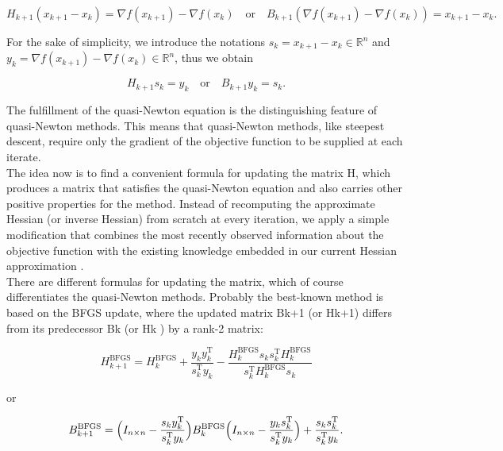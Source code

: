 \begin{equation*}
    H_{k+1} (x_{k+1} - x_k) = \nabla f(x_{k+1}) - \nabla f(x_k) \quad \text{or} \quad B_{k+1} (\nabla f(x_{k+1}) - \nabla f(x_k)) = x_{k+1} - x_k.
\end{equation*}

For the sake of simplicity, we introduce the notations $s_k = x_{k+1} - x_k \in \mathbb{R}^n$ and $y_k = \nabla f(x_{k+1}) - \nabla f(x_k) \in \mathbb{R}^n$, thus we obtain

\begin{equation}\label{quasi-NewtonEquation}
    H_{k+1} s_k = y_k \quad \text{or} \quad B_{k+1} y_k = s_k.
\end{equation}

The fulfillment of the quasi-Newton equation is the distinguishing feature of quasi-Newton methods. This means that quasi-Newton methods, like steepest descent, require only the gradient of the objective function to be supplied at each iterate. \\
The idea now is to find a convenient formula for updating the matrix H, which produces a matrix that satisfies the quasi-Newton equation and also carries other positive properties for the method. Instead of recomputing the approximate Hessian (or inverse Hessian) from scratch at every iteration, we apply a simple modification that combines the most recently observed information about the objective function with the existing knowledge embedded in our current Hessian approximation \cite[p.~139]{NocedalWright:2006}. \\
There are different formulas for updating the matrix, which of course differentiates the quasi-Newton methods. Probably the best-known method is based on the BFGS update, where the updated matrix Bk+1 (or Hk+1) differs from its predecessor Bk (or Hk ) by a rank-2 matrix:

\begin{equation}\label{DirectBFGSformula}
    H^{\mathrm{BFGS}}_{k+1} = H^{\mathrm{BFGS}}_k + \frac{y_k y^{\mathrm{T}}_k}{s^{\mathrm{T}}_k y_k} - \frac{H^{\mathrm{BFGS}}_k s_k s^{\mathrm{T}}_k H^{\mathrm{BFGS}}_k}{s^{\mathrm{T}}_k H^{\mathrm{BFGS}}_k s_k}
\end{equation}

or 

\begin{equation}\label{InverseBFGSformula}
    B^{\mathrm{BFGS}}_{k+1} = \Big{(} I_{n \times n} - \frac{s_k y^{\mathrm{T}}_k}{s_k^{\mathrm{T}} y_k} \Big{)} B^{\mathrm{BFGS}}_k \Big{(} I_{n \times n} - \frac{y_k s^{\mathrm{T}}_k}{s_k^{\mathrm{T}} y_k} \Big{)} + \frac{s_k s^{\mathrm{T}}_k}{s_k^{\mathrm{T}} y_k}.
\end{equation}

